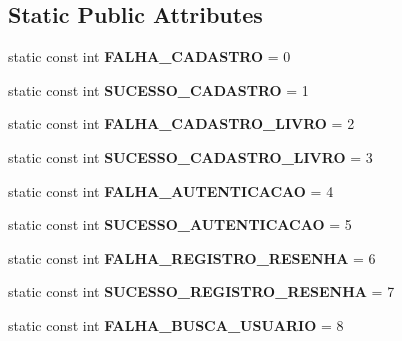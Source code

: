 \subsection*{Static Public Attributes}
\begin{DoxyCompactItemize}
\item 
\mbox{\label{classResultado_a910674f65d9d2a0367a48223190e9095}} 
static const int {\bfseries F\+A\+L\+H\+A\+\_\+\+C\+A\+D\+A\+S\+T\+RO} = 0
\item 
\mbox{\label{classResultado_a3b6e9416cd0f16582a55e857303992f6}} 
static const int {\bfseries S\+U\+C\+E\+S\+S\+O\+\_\+\+C\+A\+D\+A\+S\+T\+RO} = 1
\item 
\mbox{\label{classResultado_adb43d99688b2e483c47bd6a518918938}} 
static const int {\bfseries F\+A\+L\+H\+A\+\_\+\+C\+A\+D\+A\+S\+T\+R\+O\+\_\+\+L\+I\+V\+RO} = 2
\item 
\mbox{\label{classResultado_adbb9fe9cef578339e48fd04308e0604a}} 
static const int {\bfseries S\+U\+C\+E\+S\+S\+O\+\_\+\+C\+A\+D\+A\+S\+T\+R\+O\+\_\+\+L\+I\+V\+RO} = 3
\item 
\mbox{\label{classResultado_a2533f82b85414236612ce18297e233e2}} 
static const int {\bfseries F\+A\+L\+H\+A\+\_\+\+A\+U\+T\+E\+N\+T\+I\+C\+A\+C\+AO} = 4
\item 
\mbox{\label{classResultado_a5e96ef3ccc847e0d3be6da5203dc15d6}} 
static const int {\bfseries S\+U\+C\+E\+S\+S\+O\+\_\+\+A\+U\+T\+E\+N\+T\+I\+C\+A\+C\+AO} = 5
\item 
\mbox{\label{classResultado_a1872e97cf799c99b2ea9942b922608a7}} 
static const int {\bfseries F\+A\+L\+H\+A\+\_\+\+R\+E\+G\+I\+S\+T\+R\+O\+\_\+\+R\+E\+S\+E\+N\+HA} = 6
\item 
\mbox{\label{classResultado_aa9a0b91a332139b36805c48cee9952d5}} 
static const int {\bfseries S\+U\+C\+E\+S\+S\+O\+\_\+\+R\+E\+G\+I\+S\+T\+R\+O\+\_\+\+R\+E\+S\+E\+N\+HA} = 7
\item 
\mbox{\label{classResultado_aecd3e08624fb2c44a2acc99afb38c0dc}} 
static const int {\bfseries F\+A\+L\+H\+A\+\_\+\+B\+U\+S\+C\+A\+\_\+\+U\+S\+U\+A\+R\+IO} = 8

\end{DoxyCompactItemize}
